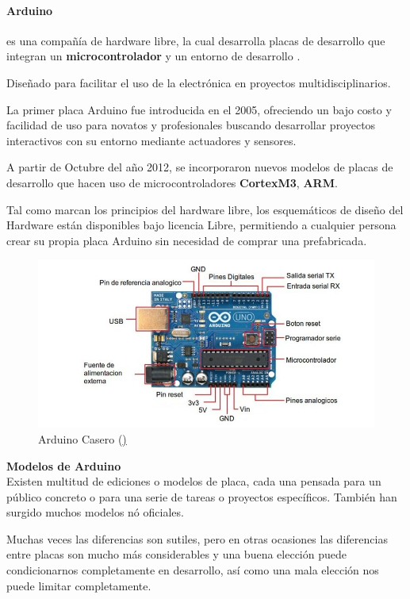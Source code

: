 \bigskip
\paragraph{Arduino} es una compañía de hardware libre, la cual desarrolla placas de desarrollo que integran un \textbf{microcontrolador} y un entorno de desarrollo  \cite{IDE}.

\bigskip
Diseñado para facilitar el uso de la electrónica en proyectos multidisciplinarios. \cite{ARDUINO}

\bigskip
La primer placa Arduino fue introducida en el 2005, ofreciendo un bajo costo y facilidad de uso para novatos y profesionales buscando desarrollar proyectos interactivos con su entorno mediante actuadores y sensores.

\bigskip
A partir de Octubre del año 2012, se incorporaron nuevos modelos de placas de desarrollo que hacen uso de microcontroladores \textbf{CortexM3}, \textbf{ARM}.

\bigskip
Tal como marcan los principios del hardware libre, los esquemáticos de diseño del Hardware están disponibles bajo licencia Libre, permitiendo a cualquier persona crear su propia placa Arduino sin necesidad de comprar una prefabricada. 


\begin{figure}[h]
	\centering
	\includegraphics[width=0.7\linewidth]{../images/caracteristicas_arduino}
	\caption[Arduino Casero]{Arduino Casero (\href{http://www.cerosecurity.com/como-construir-un-arduino-casero/})}
	\label{fig:arduinocasero}
\end{figure}


\textbf{Modelos de Arduino}  \\

Existen multitud de ediciones o modelos de placa, cada una pensada para un público concreto o para una serie de tareas o proyectos específicos. También han surgido muchos modelos nó oficiales. 

\bigskip
Muchas veces las diferencias son sutiles, pero en otras ocasiones las diferencias entre placas son mucho más considerables y una buena elección puede condicionarnos completamente en desarrollo, así como una mala elección nos puede limitar completamente. 

